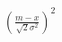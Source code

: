 \documentclass[preview]{standalone}
\begin{document}
\begin{align*}
(\frac{m - x}{\sqrt{2} \sigma^2})^2
\end{align*}
\end{document}
